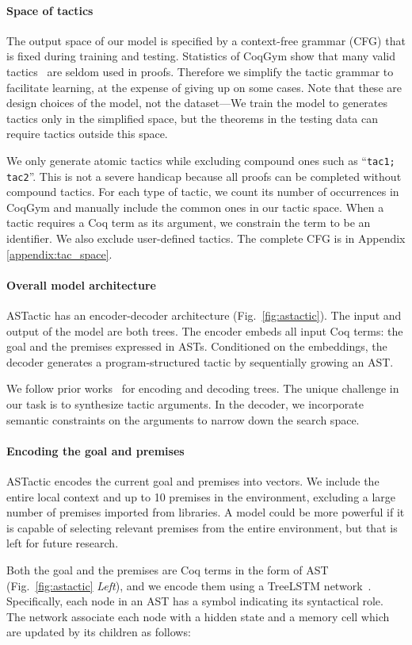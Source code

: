 \documentclass{article}
\newcommand{\smallsec}[1]{\vspace{-3mm} \paragraph{#1}}
\newcommand{\datasetname}{CoqGym}
\begin{document}
\smallsec{Space of tactics}
The output space of our model is specified by a context-free grammar (CFG) that is fixed during training and testing.
Statistics of {\datasetname } show that many valid tactics~\citep{delahaye2000tactic} are seldom used in proofs.
Therefore we simplify the tactic grammar to facilitate learning, at the expense of giving up on some cases. 
Note that these are design choices of the model, not the dataset---We train the model to generates tactics only in the simplified space, but the theorems in the testing data can require tactics outside this space. 


We only generate atomic tactics while excluding compound ones such as ``\texttt{tac1; tac2}''.
This is not a severe handicap because all proofs can be completed without compound tactics.
For each type of tactic, we count its number of occurrences in {\datasetname } and manually include the common ones in our tactic space.
When a tactic requires a Coq term as its argument, we constrain the term to be an identifier.
We also exclude user-defined tactics.
The complete CFG is in Appendix \ref{appendix:tac_space}.


\smallsec{Overall model architecture}
ASTactic has an encoder-decoder architecture (Fig.~\ref{fig:astactic}). 
The input and output of the model are both trees.
The encoder embeds all input Coq terms: the goal and the premises expressed in ASTs. 
Conditioned on the embeddings, the decoder generates a program-structured tactic by sequentially growing an AST.

We follow prior works~\citep{tai2015improved, yin2017syntactic} for encoding and decoding trees.
The unique challenge in our task is to synthesize tactic arguments.
In the decoder, we incorporate semantic constraints on the arguments to narrow down the search space.



\smallsec{Encoding the goal and premises}
ASTactic encodes the current goal and premises into vectors.
We include the entire local context and up to 10 premises in the environment, excluding a large number of premises imported from libraries.
A model could be more powerful if it is capable of selecting relevant premises from the entire environment, but that is left for future research.

Both the goal and the premises are Coq terms in the form of AST (Fig.~\ref{fig:astactic} \textit{Left}), and we encode them using a TreeLSTM network~\citep{tai2015improved}. 
Specifically, each node in an AST has a symbol  indicating its syntactical role.
The network associate each node with a hidden state  and a memory cell  which are updated by its children as follows:
\end{document}
